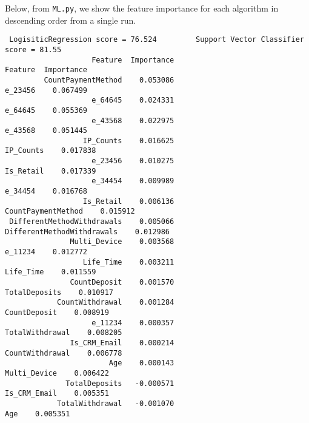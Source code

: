 \documentclass[11pt]{article} %
\begin{document}
Below, from {\tt ML.py}, we show the feature importance for each algorithm in
descending order from a single run.
\small
{\color{blue}
\begin{verbatim}
 LogisiticRegression score = 76.524         Support Vector Classifier score = 81.55
                    Feature  Importance                         Feature  Importance
         CountPaymentMethod    0.053086                         e_23456    0.067499
                    e_64645    0.024331                         e_64645    0.055369
                    e_43568    0.022975                         e_43568    0.051445
                  IP_Counts    0.016625                       IP_Counts    0.017838
                    e_23456    0.010275                       Is_Retail    0.017339
                    e_34454    0.009989                         e_34454    0.016768
                  Is_Retail    0.006136              CountPaymentMethod    0.015912
 DifferentMethodWithdrawals    0.005066      DifferentMethodWithdrawals    0.012986
               Multi_Device    0.003568                         e_11234    0.012772
                  Life_Time    0.003211                       Life_Time    0.011559
               CountDeposit    0.001570                   TotalDeposits    0.010917
            CountWithdrawal    0.001284                    CountDeposit    0.008919
                    e_11234    0.000357                 TotalWithdrawal    0.008205
               Is_CRM_Email    0.000214                 CountWithdrawal    0.006778
                        Age    0.000143                    Multi_Device    0.006422
              TotalDeposits   -0.000571                    Is_CRM_Email    0.005351
            TotalWithdrawal   -0.001070                             Age    0.005351
                                            

\end{verbatim}}
\end{document}
